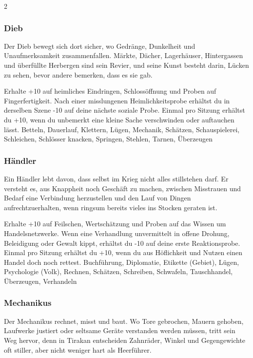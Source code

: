 {\begin{multicols*}{2}
        \subsubsection*{Dieb}
        Der Dieb bewegt sich dort sicher, wo Gedränge, Dunkelheit und Unaufmerksamkeit zusammenfallen. Märkte, Dächer, Lagerhäuser, Hintergassen und überfüllte Herbergen sind sein Revier, und seine Kunst besteht darin, Lücken zu sehen, bevor andere bemerken, dass es sie gab.

        \wegespielwertebox
        {Erhalte +10 auf heimliches Eindringen, Schlossöffnung und Proben auf Fingerfertigkeit.}
        {Nach einer misslungenen Heimlichkeitsprobe erhältst du in derselben Szene -10 auf deine nächste soziale Probe.}
        {Einmal pro Sitzung erhältst du +10, wenn du unbemerkt eine kleine Sache verschwinden oder auftauchen lässt.}
        {Betteln, Dauerlauf, Klettern, Lügen, Mechanik, Schätzen, Schauspielerei, Schleichen, Schlösser knacken, Springen, Stehlen, Tarnen, Überzeugen}

        \subsubsection*{Händler}
        Ein Händler lebt davon, dass selbst im Krieg nicht alles stillstehen darf. Er versteht es, aus Knappheit noch Geschäft zu machen, zwischen Misstrauen und Bedarf eine Verbindung herzustellen und den Lauf von Dingen aufrechtzuerhalten, wenn ringsum bereits vieles ins Stocken geraten ist.

        \wegespielwertebox
        {Erhalte +10 auf Feilschen, Wertschätzung und Proben auf das Wissen um Handelsnetzwerke.}
        {Wenn eine Verhandlung unvermittelt in offene Drohung, Beleidigung oder Gewalt kippt, erhältst du -10 auf deine erste Reaktionsprobe.}
        {Einmal pro Sitzung erhältst du +10, wenn du aus Höflichkeit und Nutzen einen Handel doch noch rettest.}
        {Buchführung, Diplomatie, Etikette (Gebiet), Lügen, Psychologie (Volk), Rechnen, Schätzen, Schreiben, Schwafeln, Tauschhandel, Überzeugen, Verhandeln}

        \subsubsection*{Mechanikus}
        Der Mechanikus rechnet, misst und baut. Wo Tore gebrochen, Mauern gehoben, Laufwerke justiert oder seltsame Geräte verstanden werden müssen, tritt sein Weg hervor, denn in Tirakan entscheiden Zahnräder, Winkel und Gegengewichte oft stiller, aber nicht weniger hart als Heerführer.


\end{multicols*}}
